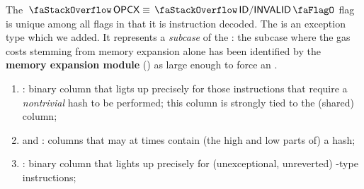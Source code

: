 \saNote{} The $\stackOpcx{} \equiv \stackDecInvalidFlag{}$ flag is unique among all flags in that it is instruction decoded. The \mxpxSH{} is an exception type which we added. It represents a \emph{subcase} of the \oogxSH{}: the subcase where the gas costs stemming from memory expansion alone has been identified by the \textbf{memory expansion module} (\mxpMod{}) as large enough to force an \oogxSH{}.
\begin{enumerate}[resume]
	\item \stackHashInfoFlag{}:
		binary column that ligts up precisely for those instructions that require a \emph{nontrivial}  hash to be performed;
		this column is strongly tied to the (shared) \hashInfoStamp{} column; 
	\item \stackHashInfoValHi{} and \stackHashInfoValLo{}:
		columns that may at times contain (the high and low parts of) a  hash;
	\item \stackLogFlag{}:
		binary column that lights up precisely for (unexceptional, unreverted) -type instructions;
\end{enumerate}

